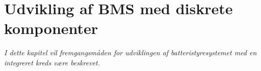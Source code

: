 \chapter{Udvikling af BMS med diskrete komponenter}\label{kap:udvikling_diskret}

\emph{I dette kapitel vil fremgangsmåden for udviklingen af batteristyresystemet med en integreret kreds være beskrevet.}